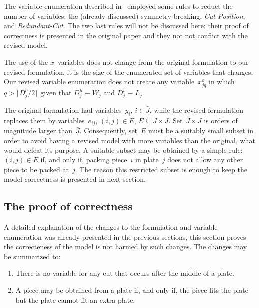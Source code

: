 \documentclass[runningheads]{llncs}
\begin{document}
The variable enumeration described in~\cite{furini:2016} employed some rules to reduct the number of variables: the (already discussed) symmetry-breaking, \emph{Cut-Position}, and \emph{Redundant-Cut}.
The two last rules will not be discussed here: their proof of correctness is presented in the original paper and they not not conflict with the revised model.

The use of the \(x\)~variables does not change from the original formulation to our revised formulation, it is the size of the enumerated set of variables that changes.
Our revised variable enumeration does not create any variable~\(x^o_{jq}\) in which \(q > \lceil D^o_j / 2 \rceil \) given that \(D^h_j \equiv W_j\) and \(D^v_j \equiv L_j\).

The original formulation had variables~\(y_i\), \(i \in \bar{J}\), while the revised formulation replaces them by variables~\(e_{ij}\), \((i, j) \in E\), \(E \subseteq \bar{J} \times J\).
Set~\(\bar{J} \times J\) is orders of magnitude larger than~\(\bar{J}\).
Consequently, set~\(E\) must be a suitably small subset in order to avoid having a revised model with more variables than the original, what would defeat its purpose.
A suitable subset may be obtained by a simple rule: \((i, j) \in E\) if, and only if, packing piece~\(i\) in plate~\(j\) does not allow any other piece to be packed at~\(j\).
The reason this restricted subset is enough to keep the model correctness is presented in next section.


\subsection{The proof of correctness}

A detailed explanation of the changes to the formulation and variable enumeration was already presented in the previous sections, this section proves the correcteness of the model is not harmed by such changes. The changes may be summarized to:

\begin{enumerate}
\item There is no variable for any cut that occurs after the middle of a plate.
\item A piece may be obtained from a plate if, and only if, the piece fits the plate but the plate cannot fit an extra plate.
\end{enumerate}
 
\end{document}
